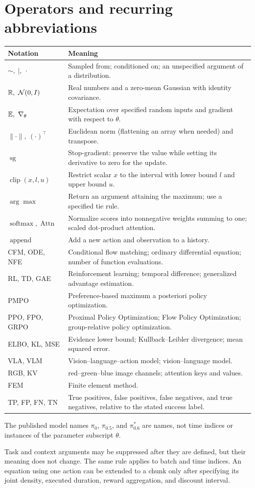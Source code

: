\section*{Operators and recurring abbreviations}
\begin{longtable}{@{}p{40mm}p{116mm}@{}}
\toprule Notation & Meaning\\\midrule\endhead
$\sim,\ \mid,\ \cdot$ & Sampled from; conditioned on; an unspecified argument of a distribution.\\
$\mathbb{R},\ \mathcal N(0,I)$ & Real numbers and a zero-mean Gaussian with identity covariance.\\
$\E,\ \nabla_\theta$ & Expectation over specified random inputs and gradient with respect to $\theta$.\\
$\|\cdot\|,\ (\cdot)^\top$ & Euclidean norm (flattening an array when needed) and transpose.\\
$\operatorname{sg}$ & Stop-gradient: preserve the value while setting its derivative to zero for the update.\\
$\operatorname{clip}(x,l,u)$ & Restrict scalar $x$ to the interval with lower bound $l$ and upper bound $u$.\\
$\arg\max$ & Return an argument attaining the maximum; use a specified tie rule.\\
$\operatorname{softmax},\operatorname{Attn}$ & Normalize scores into nonnegative weights summing to one; scaled dot-product attention.\\
$\operatorname{append}$ & Add a new action and observation to a history.\\
CFM, ODE, NFE & Conditional flow matching; ordinary differential equation; number of function evaluations.\\
RL, TD, GAE & Reinforcement learning; temporal difference; generalized advantage estimation.\\
PMPO & Preference-based maximum a posteriori policy optimization.\\
PPO, FPO, GRPO & Proximal Policy Optimization; Flow Policy Optimization; group-relative policy optimization.\\
ELBO, KL, MSE & Evidence lower bound; Kullback--Leibler divergence; mean squared error.\\
VLA, VLM & Vision--language--action model; vision--language model.\\
RGB, KV & red--green--blue image channels; attention keys and values.\\
FEM & Finite element method.\\
TP, FP, FN, TN & True positives, false positives, false negatives, and true negatives, relative to the stated success label.\\
\bottomrule
\end{longtable}

The published model names $\pi_0$, $\pi_{0.5}$, and $\pi^*_{0.6}$ are names, not time indices or instances of the parameter subscript $\theta$.

Task and context arguments may be suppressed after they are defined, but their meaning does not change. The same rule applies to batch and time indices. An equation using one action can be extended to a chunk only after specifying its joint density, executed duration, reward aggregation, and discount interval.
